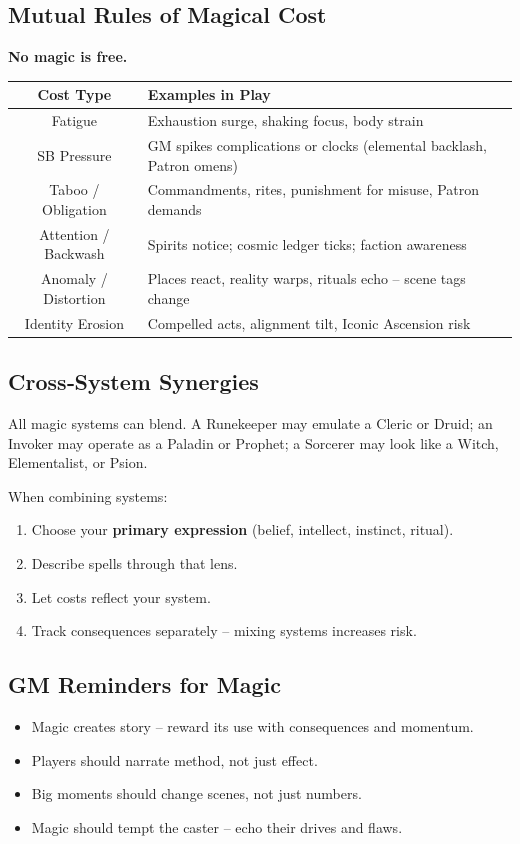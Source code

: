 \subsection{Mutual Rules of Magical Cost}
\begin{center}
\textbf{No magic is free.}
\end{center}

\begin{center}
\small
\begin{tabular}{|c|p{9cm}|}
\hline
\textbf{Cost Type} & \textbf{Examples in Play} \\
\hline
Fatigue & Exhaustion surge, shaking focus, body strain \\
SB Pressure & GM spikes complications or clocks (elemental backlash, Patron omens) \\
Taboo / Obligation & Commandments, rites, punishment for misuse, Patron demands \\
Attention / Backwash & Spirits notice; cosmic ledger ticks; faction awareness \\
Anomaly / Distortion & Places react, reality warps, rituals echo -- scene tags change \\
Identity Erosion & Compelled acts, alignment tilt, Iconic Ascension risk \\
\hline
\end{tabular}
\end{center}

\subsection{Cross‑System Synergies}
All magic systems can blend. A Runekeeper may emulate a Cleric or Druid; an Invoker may operate as a Paladin or Prophet; a Sorcerer may look like a Witch, Elementalist, or Psion.

When combining systems:
\begin{enumerate}
    \item Choose your \textbf{primary expression} (belief, intellect, instinct, ritual).
    \item Describe spells through that lens.
    \item Let costs reflect your system.
    \item Track consequences separately -- mixing systems increases risk.
\end{enumerate}

\subsection{GM Reminders for Magic}
\begin{itemize}
    \item Magic creates story -- reward its use with consequences and momentum.
    \item Players should narrate method, not just effect.
    \item Big moments should change scenes, not just numbers.
    \item Magic should tempt the caster -- echo their drives and flaws.
\end{itemize}

